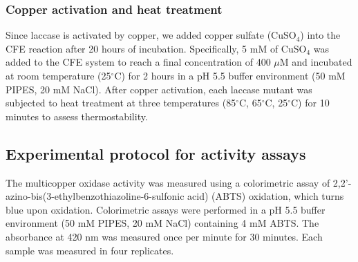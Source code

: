 \subsubsection{Copper activation and heat treatment}
Since laccase is activated by copper, we added copper sulfate (CuSO$_4$) into the CFE reaction after 20 hours of incubation. Specifically, 5 mM of CuSO$_4$ was added to the CFE system to reach a final concentration of 400 $\mu$M and incubated at room temperature (25$^\circ$C) for 2 hours in a pH 5.5 buffer environment (50 mM PIPES, 20 mM NaCl). After copper activation, each laccase mutant was subjected to heat treatment at three temperatures (85$^\circ$C, 65$^\circ$C, 25$^\circ$C) for 10 minutes to assess thermostability.

\subsection{Experimental protocol for activity assays}\label{sec:activity_assays}
The multicopper oxidase activity was measured using a colorimetric assay of 2,2'-azino-bis(3-ethylbenzothiazoline-6-sulfonic acid) (ABTS) oxidation, which turns blue upon oxidation. Colorimetric assays were performed in a pH 5.5 buffer environment (50 mM PIPES, 20 mM NaCl) containing 4 mM ABTS. The absorbance at 420 nm was measured once per minute for 30 minutes. Each sample was measured in four replicates.